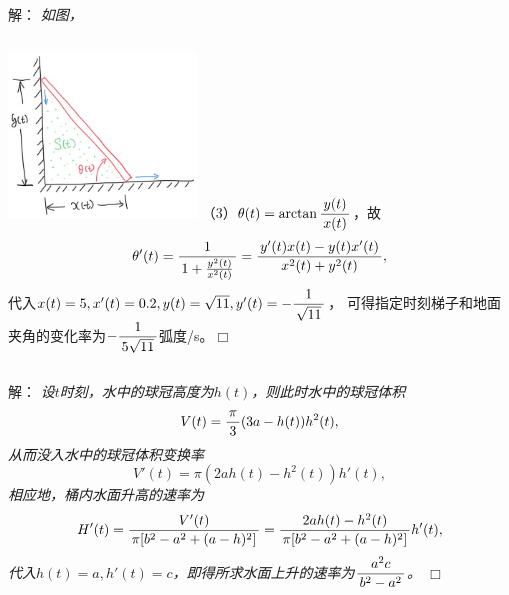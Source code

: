 \begin{frame}
	\linespread{1.5}
	\small 解：\it
	如图，
	\begin{columns}
		\includegraphics[width=5cm]{./images/ch2/ladder.jpg}
		（3）$\theta(t)=\arctan\displaystyle\frac{\,{y(t)}\,}{\,{x(t)}\,}$，故
		$$\theta'(t)=\displaystyle\frac{\,{1}\,}{\,{1+\frac{y^2(t)}{x^2(t)}}\,}
		=\displaystyle\frac{\,{y'(t)x(t)-y(t)x'(t)}\,}{\,{x^2(t)+y^2(t)}\,},$$
		\pause 代入$x(t)=5,x'(t)=0.2,y(t)=\sqrt{11},y'(t)=-\displaystyle\frac{\,{1}\,}{\,{\sqrt{11}}\,}$，
		可得指定时刻梯子和地面夹角的变化率为$-\displaystyle\frac{\,{1}\,}{\,{5\sqrt{11}}\,}$弧度/s。\hfill$\Box$
	\end{columns}
\end{frame}

\begin{frame}
	\linespread{1.5}
	\pause
	
	\small 解：\it
	设$t$时刻，水中的球冠高度为$h(t)$，则此时水中的球冠体积
	$$V(t)=\displaystyle\frac{\,{\pi}\,}{\,{3}\,}(3a-h(t))h^2(t),$$
	\pause 从而没入水中的球冠体积变换率
	$$V'(t)=\pi(2ah(t)-h^2(t))h'(t),$$
	\pause 相应地，桶内水面升高的速率为
	$$H'(t)=\displaystyle\frac{\,{V'(t)}\,}{\,{\pi [b^2-a^2+(a-h)^2]}\,}
	=\displaystyle\frac{\,{2ah(t)-h^2(t)}\,}{\,{\pi [b^2-a^2+(a-h)^2]}\,}h'(t),$$
	\pause 代入$h(t)=a,h'(t)=c$，即得所求水面上升的速率为$\displaystyle\frac{\,{a^2c}\,}{\,{b^2-a^2}\,}$。
	\hfill$\Box$
\end{frame}